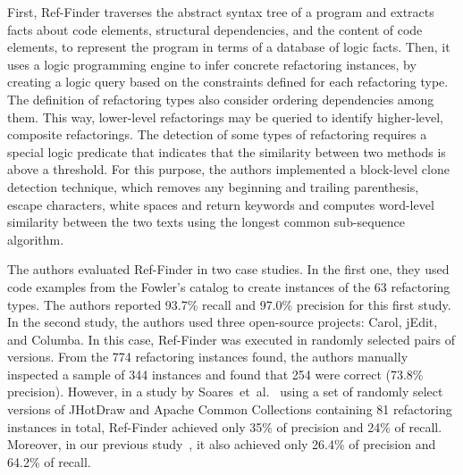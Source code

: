 First, Ref-Finder traverses the abstract syntax tree of a program and extracts facts about code elements, structural dependencies, and the content of code elements, to represent the program in terms of a database of logic facts. Then, it uses a logic programming engine to infer concrete refactoring instances, by creating a logic query based on the constraints defined for each refactoring type.
The definition of refactoring types also consider ordering dependencies among them. This way, lower-level refactorings may be queried to identify higher-level, composite refactorings.
The detection of some types of refactoring requires a special logic predicate that indicates that the similarity between two methods is above a threshold. For this purpose, the authors implemented a block-level clone detection technique, which removes any beginning and trailing parenthesis, escape characters, white spaces and return keywords and computes word-level similarity between the two texts using the longest common sub-sequence algorithm.

The authors evaluated Ref-Finder in two case studies.
In the first one, they used code examples from the Fowler's catalog to create instances of the 63 refactoring types. The authors reported 93.7\% recall and 97.0\% precision for this first study.
In the second study, the authors used three open-source projects: Carol, jEdit, and Columba. In this case, Ref-Finder was executed in randomly selected pairs of versions. From the 774 refactoring instances found, the authors manually inspected a sample of 344 instances and found that 254 were correct (73.8\% precision).
However, in a study by Soares~et~al.~\cite{Soares:2013} using a set of randomly select versions of JHotDraw and Apache Common Collections containing 81 refactoring instances in total, Ref-Finder achieved only 35\% of precision and 24\% of recall.
Moreover, in our previous study~\cite{msr2017}, it also achieved only 26.4\% of precision and 64.2\% of recall.
